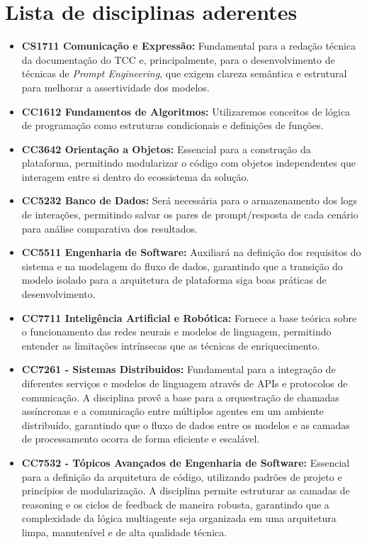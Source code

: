 \documentclass[11pt,a4,oneside]{article}
\begin{document}
\section*{Lista de disciplinas aderentes}
\begin{itemize}
    \item \textbf{CS1711 Comunicação e Expressão:} Fundamental para a redação técnica da documentação do TCC e, principalmente, para o desenvolvimento de técnicas de \textit{Prompt Engineering}, que exigem clareza semântica e estrutural para melhorar a assertividade dos modelos.
    \item \textbf{CC1612 Fundamentos de Algoritmos:} Utilizaremos conceitos de lógica de programação como estruturas condicionais e definições de funções.
    \item \textbf{CC3642 Orientação a Objetos:} Essencial para a construção da plataforma, permitindo modularizar o código com objetos independentes que interagem entre si dentro do ecossistema da solução.
    \item \textbf{CC5232 Banco de Dados:} Será necessária para o armazenamento dos logs de interações, permitindo salvar os pares de prompt/resposta de cada cenário para análise comparativa dos resultados.
    \item \textbf{CC5511 Engenharia de Software:} Auxiliará na definição dos requisitos do sistema e na modelagem do fluxo de dados, garantindo que a transição do modelo isolado para a arquitetura de plataforma siga boas práticas de desenvolvimento.
    \item \textbf{CC7711 Inteligência Artificial e Robótica:} Fornece a base teórica sobre o funcionamento das redes neurais e modelos de linguagem, permitindo entender as limitações intrínsecas que as técnicas de enriquecimento.
    \item \textbf{CC7261 - Sistemas Distribuidos:} Fundamental para a integração de diferentes serviços e modelos de linguagem através de APIs e protocolos de comunicação. A disciplina provê a base para a orquestração de chamadas assíncronas e a comunicação entre múltiplos agentes em um ambiente distribuído, garantindo que o fluxo de dados entre os modelos e as camadas de processamento ocorra de forma eficiente e escalável.
    \item \textbf{CC7532 - Tópicos Avançados de Engenharia de Software:} Essencial para a definição da arquitetura de código, utilizando padrões de projeto e princípios de modularização. A disciplina permite estruturar as camadas de reasoning e os ciclos de feedback de maneira robusta, garantindo que a complexidade da lógica multiagente seja organizada em uma arquitetura limpa, manutenível e de alta qualidade técnica.
    
\end{itemize}
\end{document}
